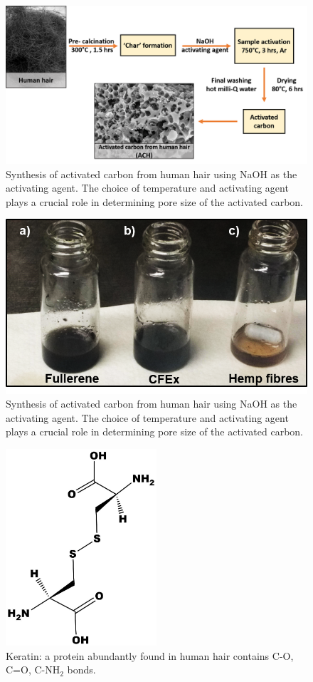 \begin{figure}[tbh!]
  \centering
  \includegraphics[width=\textwidth]{SF/ACHsyn}
    \caption{Synthesis of activated carbon from human hair using NaOH as the activating agent. The choice of temperature and activating agent plays a crucial role in determining pore size of the activated carbon.}
  \label{SF:ACHsyn}
\end{figure}
\begin{figure}[tbh!]
  \centering
  \includegraphics[width=\textwidth]{SF/CFExsol}
    \caption{Synthesis of activated carbon from human hair using NaOH as the activating agent. The choice of temperature and activating agent plays a crucial role in determining pore size of the activated carbon.}
  \label{SF:CFExsol}
\end{figure}
\begin{figure}[tbh!]
  \centering
  \includegraphics[width=0.5\textwidth]{SF/keratin}
    \caption{Keratin: a protein abundantly found in human hair contains C-O, C=O, C-NH$_2$ bonds.} 
    \label{SF:keratin}
\end{figure}
